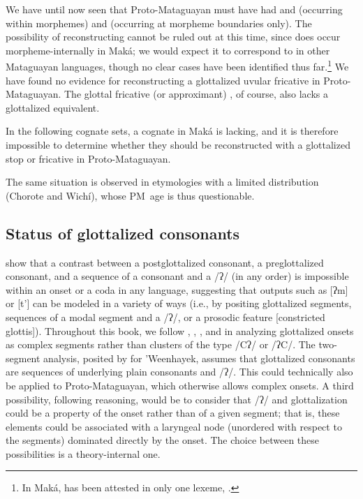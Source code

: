 We have until now seen that Proto-Mataguayan must have had  and  (occurring within morphemes) and  (occurring at morpheme boundaries only). The possibility of reconstructing  cannot be ruled out at this time, since  does occur morpheme-internally in Maká; we would expect it to correspond to  in other Mataguayan languages, though no clear cases have been identified thus far.\footnote{In Maká,  has been attested in only one lexeme,  \citep[352]{AG99}.} We have found no evidence for reconstructing a glottalized uvular fricative  in Proto-Mataguayan. The glottal fricative (or approximant) , of course, also lacks a glottalized equivalent.

In the following cognate sets, a cognate in Maká is lacking, and it is therefore impossible to determine whether they should be reconstructed with a glottalized stop or fricative in Proto-Mataguayan.

\begin{exe}
    \ex \lick
    \ex \burn
    \ex \resin
    \ex \snail
    \ex \fence
    \ex \belly
    \ex \jararaca
\end{exe}

The same situation is observed in etymologies with a limited distribution (Chorote and Wichí), whose PM~age is thus questionable.

\begin{exe}
    \ex \spitcw
    \ex \suckcw
    \ex \whiteegret
\end{exe}

\subsection{Status of glottalized consonants}\label{glott-status}
\citet{WK-CG-04} show that a contrast between a postglottalized consonant, a preglottalized consonant, and a sequence of a consonant and a /ʔ/ (in any order) is impossible within an onset or a coda in any language, suggesting that outputs such as [ʔm] or [t’] can be modeled in a variety of ways (i.e., by positing glottalized segments, sequences of a modal segment and a /ʔ/, or a prosodic feature [constricted glottis]). Throughout this book, we follow \citet{AG94}, \citet{VN14}, \citet{JC14b}, and \citet{AnG15} in analyzing glottalized onsets as complex segments rather than clusters of the type /Cʔ/ or /ʔC/. The two-segment analysis, posited by \citet[28–30]{KC94} for ’Weenhayek, assumes that glottalized consonants are sequences of underlying plain consonants and /ʔ/. This could technically also be applied to Proto-Mataguayan, which otherwise allows complex onsets. A third possibility, following  reasoning, would be to consider that /ʔ/ and glottalization could be a property of the onset rather than of a given segment; that is, these elements could be associated with a laryngeal node (unordered with respect to the segments) dominated directly by the onset. The choice between these possibilities is a theory-internal one.

